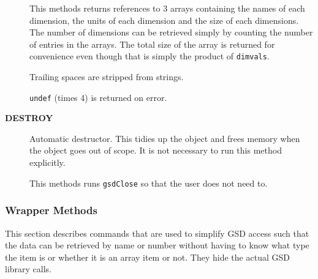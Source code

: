 \documentclass[twoside,11pt]{article}
\renewcommand{\_}{\texttt{\symbol{95}}}
\begin{document}
\begin{description}
This methods returns references to 3 arrays containing the
names of each dimension, the units of each dimension and the
size of each dimensions. The number of dimensions can be
retrieved simply by counting the number of entries in the
arrays. The total size of the array is returned for convenience
even though that is simply the product of \texttt{dimvals}.

Trailing spaces are stripped from strings.

\texttt{undef} (times 4) is returned on error.

\item[\textbf{DESTROY}] \mbox{}

Automatic destructor. This tidies up the object and frees
memory when the object goes out of scope. It is not
necessary to run this method explicitly.

This methods runs \texttt{gsdClose} so that the user does not
need to.

\end{description}

\subsubsection{Wrapper Methods\label{Wrapper_Methods}}

This section describes commands that are used to simplify GSD
access such that the data can be retrieved by name or number without
having to know what type the item is or whether it is an array item
or not. They hide the actual GSD library calls.
\end{document}
